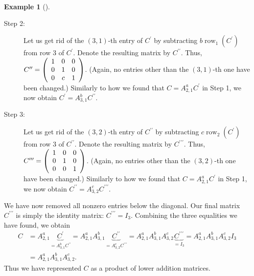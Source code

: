\documentclass[numbers=enddot,12pt,final,onecolumn,notitlepage]{scrartcl}%
\theoremstyle{definition}
\newtheorem{exam}[theo]{Example}
\newenvironment{example}[1][]
{\begin{exam}[#1]\begin{leftbar}}
{\end{leftbar}\end{exam}}
\begin{document}
\begin{example}
\begin{description}
\item[Step 2:] Let us get rid of the $\left(  3,1\right)  $-th entry of
$C^{\prime}$ by subtracting $b\operatorname*{row}\nolimits_{1}\left(
C^{\prime}\right)  $ from row $3$ of $C^{\prime}$. Denote the resulting matrix
by $C^{\prime\prime}$. Thus, $C^{\prime\prime}=\left(
\begin{array}
[c]{ccc}%
1 & 0 & 0\\
0 & 1 & 0\\
0 & c & 1
\end{array}
\right)  $. (Again, no entries other than the $\left(  3,1\right)  $-th one
have been changed.) Similarly to how we found that $C=A_{2,1}^{a}C^{\prime}$
in Step 1, we now obtain $C^{\prime}=A_{3,1}^{b}C^{\prime\prime}$.

\item[Step 3:] Let us get rid of the $\left(  3,2\right)  $-th entry of
$C^{\prime\prime}$ by subtracting $c\operatorname*{row}\nolimits_{2}\left(
C^{\prime}\right)  $ from row $3$ of $C^{\prime\prime}$. Denote the resulting
matrix by $C^{\prime\prime\prime}$. Thus, $C^{\prime\prime\prime}=\left(
\begin{array}
[c]{ccc}%
1 & 0 & 0\\
0 & 1 & 0\\
0 & 0 & 1
\end{array}
\right)  $. (Again, no entries other than the $\left(  3,2\right)  $-th one
have been changed.) Similarly to how we found that $C=A_{2,1}^{a}C^{\prime}$
in Step 1, we now obtain $C^{\prime\prime}=A_{3,2}^{c}C^{\prime\prime\prime}$.
\end{description}

We have now removed all nonzero entries below the diagonal. Our final matrix
$C^{\prime\prime\prime}$ is simply the identity matrix: $C^{\prime\prime
\prime}=I_{3}$. Combining the three equalities we have found, we obtain%
\begin{align}
C  &  =A_{2,1}^{a}\underbrace{C^{\prime}}_{=A_{3,1}^{b}C^{\prime\prime}%
}=A_{2,1}^{a}A_{3,1}^{b}\underbrace{C^{\prime\prime}}_{=A_{3,2}^{c}%
C^{\prime\prime\prime}}=A_{2,1}^{a}A_{3,1}^{b}A_{3,2}^{c}\underbrace{C^{\prime
\prime\prime}}_{=I_{3}}=A_{2,1}^{a}A_{3,1}^{b}A_{3,2}^{c}I_{3}\nonumber\\
&  =A_{2,1}^{a}A_{3,1}^{b}A_{3,2}^{c}.
\label{eq.exam.thm.triangular.Alamuv.c.3}%
\end{align}
Thus we have represented $C$ as a product of lower addition matrices.


\end{example}
\end{document}
